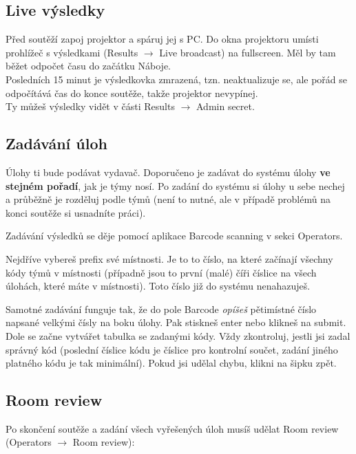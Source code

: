 \documentclass[vyfuk,\classoptions]{fksempty}
\begin{document}
\subsection{Live výsledky}
Před soutěží zapoj projektor a spáruj jej s PC. Do okna projektoru umísti prohlížeč
s výsledkami (Results $\rightarrow$ Live broadcast) na fullscreen. Měl by tam běžet
odpočet času do začátku Náboje. \\


\noindent
Posledních 15 minut je výsledkovka zmrazená, tzn. neaktualizuje se, ale pořád
se odpočítává čas do konce soutěže, takže projektor nevypínej. \\

\noindent
Ty můžeš výsledky vidět v části Results $\rightarrow$ Admin secret.

\subsection{Zadávání úloh}
Úlohy ti bude podávat vydavač. Doporučeno je zadávat do systému úlohy
{\bf ve stejném pořadí}, jak je týmy nosí. Po zadání do systému si úlohy u sebe
nechej a průběžně je rozděluj podle týmů (není to nutné, ale v případě problémů
na konci soutěže si usnadníte práci).

\bigskip

\noindent
Zadávání výsledků se děje pomocí aplikace Barcode scanning v sekci Operators.

\smallskip

\noindent
Nejdříve vybereš prefix své místnosti. Je to to číslo, na které začínají
všechny kódy týmů v místnosti (případně jsou to první (malé) číři číslice
na všech úlohách, které máte v místnosti). Toto číslo již do systému nenahazuješ.

\smallskip

\noindent
Samotné zadávání funguje tak, že do pole Barcode \emph{opíšeš} pětimístné
číslo napsané velkými čísly na boku úlohy. Pak stiskneš enter nebo klikneš
na submit. Dole se začne vytvářet tabulka se zadanými kódy. Vždy zkontroluj,
jestli jsi zadal správný kód (poslední číslice kódu je číslice pro kontrolní
součet,  zadání jiného platného kódu je tak minimální).
Pokud jsi udělal chybu, klikni na šipku zpět.

\subsection{Room review}
Po skončení soutěže a zadání všech vyřešených úloh musíš udělat Room review
(Operators $\rightarrow$ Room review):
\end{document}
